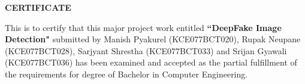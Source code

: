 
\vspace*{1in}

\begin{center}
	\large{\textbf{CERTIFICATE}}
\end{center}
\vspace{1cm}
This is to certify that this major project work entitled \textbf{``DeepFake Image Detection"} submitted by Manish Pyakurel (KCE077BCT020), Rupak Neupane (KCE077BCT028), Sarjyant Shrestha (KCE077BCT033) and Srijan Gyawali\\(KCE077BCT036) has been examined and accepted as the partial fulfillment of the requirements for degree of Bachelor in Computer Engineering.\\
\vspace{1in}
		




